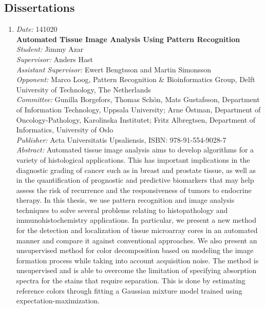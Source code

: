 \subsection{Dissertations}\label{phd}
{\small
\begin{enumerate}


\item
{\em Date:} 141020~\\
{\bf Automated Tissue Image Analysis Using Pattern Recognition}~\\
{\em Student:} Jimmy Azar~\\
{\em Supervisor:} Anders Hast~\\
{\em Assistant Supervisor:} Ewert Bengtsson and Martin Simonsson~\\
{\em Opponent:} Marco Loog, Pattern Recognition \& Bioinformatics Group, Delft University of Technology, The Netherlands~\\
{\em Committee:}  Gunilla Borgefors, Thomas Sch\"{o}n, Mats Gustafsson, Department of Information Technology, Uppsala University; Arne \"{O}stman, Department of Oncology-Pathology, Karolinska Institutet; Fritz Albregtsen, Department of Informatics, University of Oslo~\\
{\em Publisher:} Acta Universitatis Upsaliensis, ISBN: 978-91-554-9028-7 ~\\ 
{\em Abstract:} Automated tissue image analysis aims to develop algorithms for a variety of histological applications. This has important implications in the diagnostic grading of cancer such as in breast and prostate tissue, as well as in the quantification of prognostic and predictive biomarkers that may help assess the risk of recurrence and the responsiveness of tumors to endocrine therapy.
In this thesis, we use pattern recognition and image analysis techniques to solve several problems relating to histopathology and immunohistochemistry applications. In particular, we present a new method for the detection and localization of tissue microarray cores in an automated manner and compare it against conventional approaches.
We also present an unsupervised method for color decomposition based on modeling the image formation process while taking into account acquisition noise. The method is unsupervised and is able to overcome the limitation of specifying absorption spectra for the stains that require separation. This is done by estimating reference colors through fitting a Gaussian mixture model trained using expectation-maximization.

\end{enumerate}}
